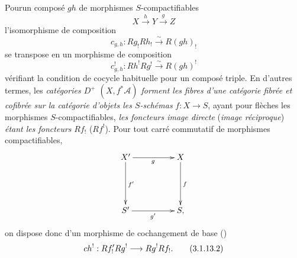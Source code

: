 \documentclass[10pt]{../fichiers-configuration-latex/smfart}
\begin{document}
\setcounter{subsubsection}{12}
\subsubsection{}
Pour\pageoriginale un composé $gh$ de morphismes $S$-compactifiables
$$
X\xrightarrow{h}Y\xrightarrow{g}Z
$$
l'isomorphisme de composition
$$
c_{g,h}:Rg_{!}Rh_{!}\xrightarrow{\sim} R(gh)_{!}
$$
se transpose en un morphisme de composition
\begin{equation*}
c^{!}_{g,h}:Rh^{!}Rg^{!}\xrightarrow{\sim} R(gh)^{!}\tag{3.1.13.1}
\end{equation*}%
vérifiant la condition de cocycle habituelle pour un composé
triple. En d'autres termes, les \emph{catégories $D^{+}$
$(X,f^{\ast}\mathcal{A})$ forment les fibres d'une catégorie fibrée et
cofibrée sur la catégorie d'objets les $S$-schémas} $f:X\rightarrow
S$, ayant pour flèches les morphismes $S$-compactifiables, \emph{les
foncteurs image directe} (\resp \emph{image réciproque}) \emph{étant
les foncteurs} $Rf_{!}$ (\resp $Rf^{!}$). Pour tout carré commutatif
de morphismes compactifiables,
$$
\xymatrix@=1.75cm{
X' \ar[r]_{g} \ar[d]^{f'}& X \ar[d]^{f}\\
S' \ar[r]_{g'}& S,
}
$$
on dispose donc d'un morphisme de cochangement de base ()
\begin{equation*}
ch^{!}:Rf'_{!}Rg^{!}\longrightarrow Rg^{!} Rf_{!}{}.\tag{3.1.13.2}
\end{equation*}
\end{document}
